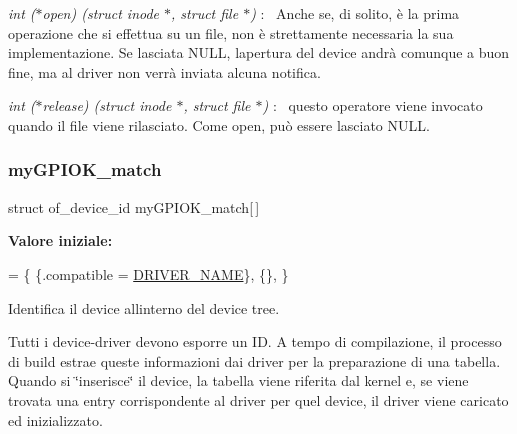 \begin{DoxyItemize}
\item {\itshape int ($\ast$open) (struct inode $\ast$, struct file $\ast$)} \+:~\newline
 Anche se, di solito, è la prima operazione che si effettua su un file, non è strettamente necessaria la sua implementazione. Se lasciata N\+U\+LL, l\textquotesingle{}apertura del device andrà comunque a buon fine, ma al driver non verrà inviata alcuna notifica.
\item {\itshape int ($\ast$release) (struct inode $\ast$, struct file $\ast$)} \+:~\newline
 questo operatore viene invocato quando il file viene rilasciato. Come open, può essere lasciato N\+U\+LL. 
\end{DoxyItemize}\mbox{\label{group___linux-_driver_gab59f49dc0fe8d885c73752b8a8163d0e}} 
\subsubsection{\texorpdfstring{my\+G\+P\+I\+O\+K\+\_\+match}{myGPIOK\_match}}
{\footnotesize\ttfamily struct of\+\_\+device\+\_\+id my\+G\+P\+I\+O\+K\+\_\+match\mbox{[}$\,$\mbox{]}\hspace{0.3cm}{\ttfamily [static]}}

{\bfseries Valore iniziale\+:}
\begin{DoxyCode}
= \{
        \{.compatible = \hyperlink{group___linux-_driver_ga25634d21648ca7fb7a2aca614bafaaeb}{DRIVER\_NAME}\},
        \{\},
\}
\end{DoxyCode}


Identifica il device all\textquotesingle{}interno del device tree. 

Tutti i device-\/driver devono esporre un ID. A tempo di compilazione, il processo di build estrae queste informazioni dai driver per la preparazione di una tabella. Quando si \char`\"{}inserisce\char`\"{} il device, la tabella viene riferita dal kernel e, se viene trovata una entry corrispondente al driver per quel device, il driver viene caricato ed inizializzato. 